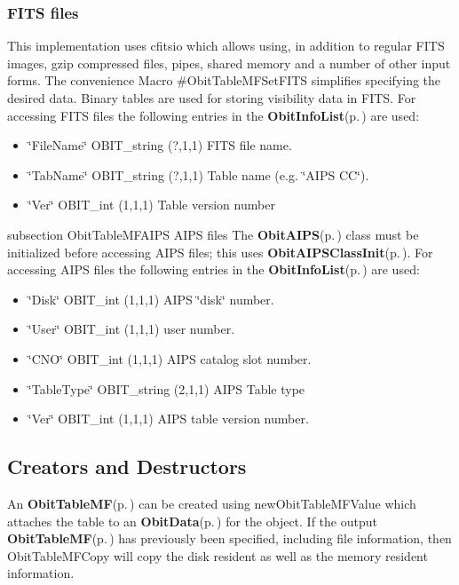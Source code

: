 \subsubsection{FITS files}\label{ObitTableWX_8h_TableFITS}
This implementation uses cfitsio which allows using, in addition to regular FITS images, gzip compressed files, pipes, shared memory and a number of other input forms. The convenience Macro \#Obit\-Table\-MFSet\-FITS simplifies specifying the desired data. Binary tables are used for storing visibility data in FITS. For accessing FITS files the following entries in the {\bf Obit\-Info\-List}{\rm (p.\,\pageref{structObitInfoList})} are used: \begin{itemize}
\item \char`\"{}File\-Name\char`\"{} OBIT\_\-string (?,1,1) FITS file name. \item \char`\"{}Tab\-Name\char`\"{} OBIT\_\-string (?,1,1) Table name (e.g. \char`\"{}AIPS CC\char`\"{}). \item \char`\"{}Ver\char`\"{} OBIT\_\-int (1,1,1) Table version number\end{itemize}
subsection Obit\-Table\-MFAIPS AIPS files The {\bf Obit\-AIPS}{\rm (p.\,\pageref{structObitAIPS})} class must be initialized before accessing AIPS files; this uses {\bf Obit\-AIPSClass\-Init}{\rm (p.\,\pageref{ObitAIPS_8c_a5})}. For accessing AIPS files the following entries in the {\bf Obit\-Info\-List}{\rm (p.\,\pageref{structObitInfoList})} are used: \begin{itemize}
\item \char`\"{}Disk\char`\"{} OBIT\_\-int (1,1,1) AIPS \char`\"{}disk\char`\"{} number. \item \char`\"{}User\char`\"{} OBIT\_\-int (1,1,1) user number. \item \char`\"{}CNO\char`\"{} OBIT\_\-int (1,1,1) AIPS catalog slot number. \item \char`\"{}Table\-Type\char`\"{} OBIT\_\-string (2,1,1) AIPS Table type \item \char`\"{}Ver\char`\"{} OBIT\_\-int (1,1,1) AIPS table version number.\end{itemize}
\subsection{Creators and Destructors}\label{ObitTableMF_8h_ObitTableMFaccess}
An {\bf Obit\-Table\-MF}{\rm (p.\,\pageref{structObitTableMF})} can be created using new\-Obit\-Table\-MFValue which attaches the table to an {\bf Obit\-Data}{\rm (p.\,\pageref{structObitData})} for the object. If the output {\bf Obit\-Table\-MF}{\rm (p.\,\pageref{structObitTableMF})} has previously been specified, including file information, then Obit\-Table\-MFCopy will copy the disk resident as well as the memory resident information.

